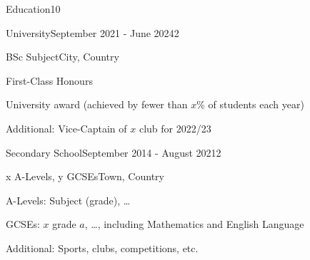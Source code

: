 \documentclass[10pt,a4paper]{CV}
\begin{document}

\begin{Section}{Education}{10}
    \begin{Institution}{University}{September 2021 - June 2024}{2}
        \begin{Position}{BSc Subject}{City, Country}
            \item First-Class Honours
            \item University award (achieved by fewer than $x$\% of students each year)
            \item Additional: Vice-Captain of $x$ club for 2022/23
        \end{Position}
    \end{Institution}

    \begin{Institution}{Secondary School}{September 2014 - August 2021}{2}
        \begin{Position}{x A-Levels, y GCSEs}{Town, Country}
            \item A-Levels: Subject (grade), \dots
            \item GCSEs: $x$ grade $a$, \dots, including Mathematics and English Language
            \item Additional: Sports, clubs, competitions, etc.
        \end{Position}
    \end{Institution}
\end{Section}
\end{document}
